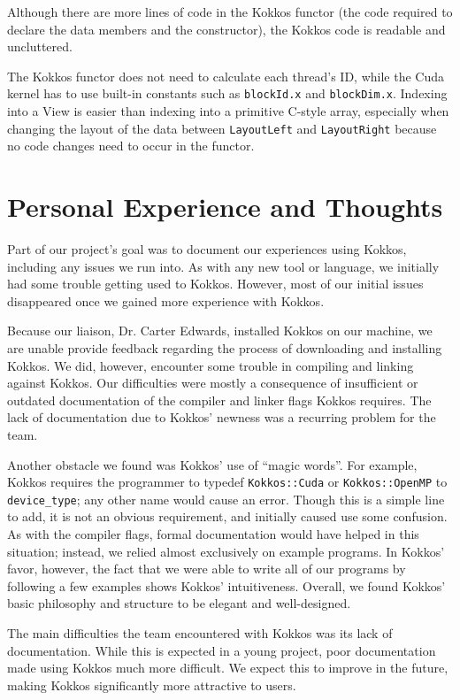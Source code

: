 Although there are more lines of code in the Kokkos functor (the code required to
declare the data members and the constructor), the Kokkos code is readable and
uncluttered.

The Kokkos functor does not need to calculate each thread's ID, while the Cuda
kernel has to use built-in constants such as \texttt{blockId.x} and \texttt{blockDim.x}.
Indexing into a View is easier than indexing into a primitive C-style array,
especially when changing the layout of the data between \texttt{LayoutLeft} and
\texttt{LayoutRight} because no code changes need to occur in the functor.

\section{Personal Experience and Thoughts}

Part of our project's goal was to document our experiences using Kokkos,
including any issues we run into.  As with any new tool or language, we
initially had some trouble getting used to Kokkos.  However, most of our initial
issues disappeared once we gained more experience with Kokkos.

Because our liaison, Dr. Carter Edwards, installed Kokkos on our machine, we are
unable provide feedback regarding the process of downloading and installing
Kokkos.  We did, however, encounter some trouble in compiling and linking
against Kokkos. Our difficulties were mostly a consequence of insufficient or
outdated documentation of the compiler and linker flags Kokkos requires.  The
lack of documentation due to Kokkos' newness was a recurring problem for the
team.

Another obstacle we found was Kokkos' use of ``magic words''.  For example,
Kokkos requires the programmer to typedef \texttt{Kokkos::Cuda} or \texttt{Kokkos::OpenMP} to
\texttt{device\_type}; any other name would cause an error.  Though this is a simple line
to add, it is not an obvious requirement, and initially caused use some
confusion.  As with the compiler flags, formal documentation would have helped
in this situation; instead, we relied almost exclusively on example programs.
In Kokkos' favor, however, the fact that we were able to write all of our programs by
following a few examples shows Kokkos' intuitiveness.  Overall, we found Kokkos'
basic philosophy and structure to be elegant and well-designed.

The main difficulties the team encountered with Kokkos was its lack of
documentation.  While this is expected in a young project, poor documentation made using
Kokkos much more difficult.  We expect this to improve in the future, making
Kokkos significantly more attractive to users.

